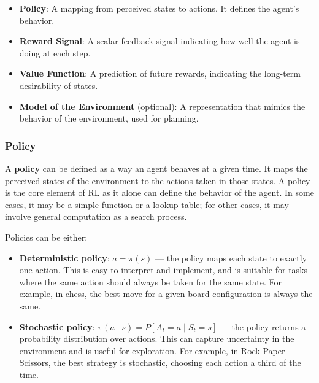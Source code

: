 \documentclass[11pt,a4paper]{article}
\begin{document}
\begin{itemize}
    \item \textbf{Policy}: A mapping from perceived states to actions. It defines the agent's behavior.
    \item \textbf{Reward Signal}: A scalar feedback signal indicating how well the agent is doing at each step.
    \item \textbf{Value Function}: A prediction of future rewards, indicating the long-term desirability of states.
    \item \textbf{Model of the Environment} (optional): A representation that mimics the behavior of the environment, used for planning.
\end{itemize}

\subsubsection{Policy}

A \textbf{policy} can be defined as a way an agent behaves at a given time. It maps the perceived states of the environment to the actions taken in those states. A policy is the core element of RL as it alone can define the behavior of the agent. In some cases, it may be a simple function or a lookup table; for other cases, it may involve general computation as a search process.

Policies can be either:
\begin{itemize}
    \item \textbf{Deterministic policy}: $a = \pi(s)$ --- the policy maps each state to exactly one action. This is easy to interpret and implement, and is suitable for tasks where the same action should always be taken for the same state. For example, in chess, the best move for a given board configuration is always the same.
    \item \textbf{Stochastic policy}: $\pi(a \mid s) = P[A_t = a \mid S_t = s]$ --- the policy returns a probability distribution over actions. This can capture uncertainty in the environment and is useful for exploration. For example, in Rock-Paper-Scissors, the best strategy is stochastic, choosing each action a third of the time.
\end{itemize}
\end{document}
